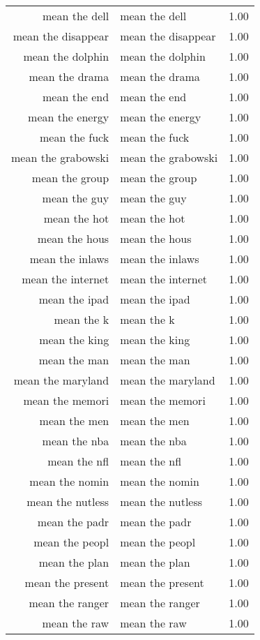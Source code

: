 \begin{table}[ht]
\begin{tabular}{rlr}
  mean the dell & mean the dell & 1.00 \\ 
  mean the disappear & mean the disappear & 1.00 \\ 
  mean the dolphin & mean the dolphin & 1.00 \\ 
  mean the drama & mean the drama & 1.00 \\ 
  mean the end & mean the end & 1.00 \\ 
  mean the energy & mean the energy & 1.00 \\ 
  mean the fuck & mean the fuck & 1.00 \\ 
  mean the grabowski & mean the grabowski & 1.00 \\ 
  mean the group & mean the group & 1.00 \\ 
  mean the guy & mean the guy & 1.00 \\ 
  mean the hot & mean the hot & 1.00 \\ 
  mean the hous & mean the hous & 1.00 \\ 
  mean the inlaws & mean the inlaws & 1.00 \\ 
  mean the internet & mean the internet & 1.00 \\ 
  mean the ipad & mean the ipad & 1.00 \\ 
  mean the k & mean the k & 1.00 \\ 
  mean the king & mean the king & 1.00 \\ 
  mean the man & mean the man & 1.00 \\ 
  mean the maryland & mean the maryland & 1.00 \\ 
  mean the memori & mean the memori & 1.00 \\ 
  mean the men & mean the men & 1.00 \\ 
  mean the nba & mean the nba & 1.00 \\ 
  mean the nfl & mean the nfl & 1.00 \\ 
  mean the nomin & mean the nomin & 1.00 \\ 
  mean the nutless & mean the nutless & 1.00 \\ 
  mean the padr & mean the padr & 1.00 \\ 
  mean the peopl & mean the peopl & 1.00 \\ 
  mean the plan & mean the plan & 1.00 \\ 
  mean the present & mean the present & 1.00 \\ 
  mean the ranger & mean the ranger & 1.00 \\ 
  mean the raw & mean the raw & 1.00 \\ 

\end{tabular}
\end{table}
